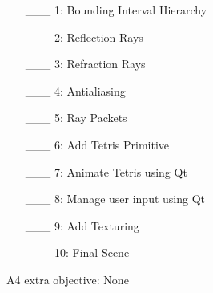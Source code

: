 \documentclass {article}
\begin{document}
\begin{enumerate}
     \item[\_\_\_ 1:]  Bounding Interval Hierarchy

     \item[\_\_\_ 2:]  Reflection Rays

     \item[\_\_\_ 3:]  Refraction Rays

     \item[\_\_\_ 4:]  Antialiasing

     \item[\_\_\_ 5:]  Ray Packets

     \item[\_\_\_ 6:]  Add Tetris Primitive

     \item[\_\_\_ 7:]  Animate Tetris using Qt

     \item[\_\_\_ 8:]  Manage user input using Qt

     \item[\_\_\_ 9:]  Add Texturing

     \item[\_\_\_ 10:] Final Scene
\end{enumerate}

A4 extra objective: None
\end{document}
